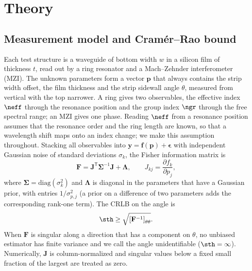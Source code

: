 \section{Theory}
\label{sec:theory}

\subsection{Measurement model and Cram\'er--Rao bound}

Each test structure is a waveguide of bottom width $w$ in a silicon film of thickness $t$, read out by a ring
resonator and a Mach--Zehnder interferometer (MZI). The unknown parameters form a vector $\mathbf{p}$ that always
contains the strip width offset, the film thickness and the strip sidewall angle $\theta$, measured from vertical
with the top narrower. A ring gives two observables, the effective index $\neff$ through the resonance position and
the group index $\ngr$ through the free spectral range; an MZI gives one phase. Reading $\neff$ from a resonance
position assumes that the resonance order and the ring length are known, so that a wavelength shift maps onto an index
change; we make this assumption throughout. Stacking all observables into
$\mathbf{y}=\mathbf{f}(\mathbf{p})+\boldsymbol{\epsilon}$ with independent Gaussian noise of standard deviations
$\sigma_k$, the Fisher information matrix is
\begin{equation}
\mathbf{F}=\mathbf{J}^{\mathsf T}\boldsymbol{\Sigma}^{-1}\mathbf{J}+\boldsymbol{\Lambda},\qquad
J_{kj}=\frac{\partial f_k}{\partial p_j},
\label{eq:fisher}
\end{equation}
where $\boldsymbol{\Sigma}=\mathrm{diag}(\sigma_k^2)$ and $\boldsymbol{\Lambda}$ is diagonal in the parameters that
have a Gaussian prior, with entries $1/\sigma_{p,j}^2$ (a prior on a difference of two parameters adds the
corresponding rank-one term). The CRLB on the angle is~\cite{kay1993}
\begin{equation}
\sth\ge\sqrt{\left[\mathbf{F}^{-1}\right]_{\theta\theta}}.
\label{eq:crlb}
\end{equation}
When $\mathbf{F}$ is singular along a direction that has a component on $\theta$, no unbiased estimator has finite
variance and we call the angle unidentifiable ($\sth=\infty$). Numerically, $\mathbf{J}$ is column-normalized and
singular values below a fixed small fraction of the largest are treated as zero.

